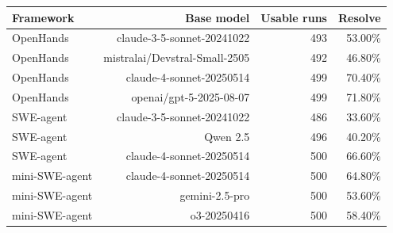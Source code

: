 \begin{tabular}{lrrr}
\toprule
Framework & Base model & Usable runs & Resolve \\
\midrule
OpenHands & claude-3-5-sonnet-20241022 & 493 & 53.00\% \\
OpenHands & mistralai/Devstral-Small-2505 & 492 & 46.80\% \\
OpenHands & claude-4-sonnet-20250514 & 499 & 70.40\% \\
OpenHands & openai/gpt-5-2025-08-07 & 499 & 71.80\% \\
SWE-agent & claude-3-5-sonnet-20241022 & 486 & 33.60\% \\
SWE-agent & Qwen 2.5 & 496 & 40.20\% \\
SWE-agent & claude-4-sonnet-20250514 & 500 & 66.60\% \\
mini-SWE-agent & claude-4-sonnet-20250514 & 500 & 64.80\% \\
mini-SWE-agent & gemini-2.5-pro & 500 & 53.60\% \\
mini-SWE-agent & o3-20250416 & 500 & 58.40\% \\
\bottomrule
\end{tabular}
